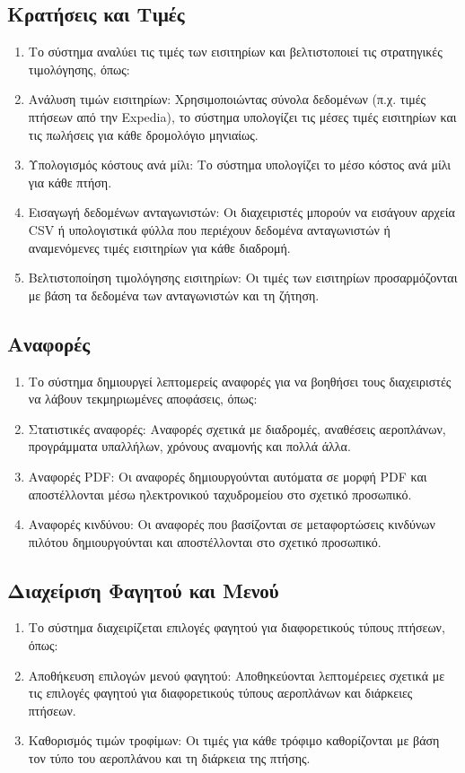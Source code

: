 \documentclass{article}
\begin{document}
	\subsection{Κρατήσεις και Τιμές}
	\begin{enumerate}
		\item Το σύστημα αναλύει τις τιμές των εισιτηρίων και βελτιστοποιεί τις στρατηγικές τιμολόγησης, όπως:
		\item Ανάλυση τιμών εισιτηρίων: Χρησιμοποιώντας σύνολα δεδομένων (π.χ. τιμές πτήσεων από την Expedia), το σύστημα υπολογίζει τις μέσες τιμές εισιτηρίων και τις πωλήσεις για κάθε δρομολόγιο μηνιαίως.
		\item Υπολογισμός κόστους ανά μίλι: Το σύστημα υπολογίζει το μέσο κόστος ανά μίλι για κάθε πτήση.
		\item Εισαγωγή δεδομένων ανταγωνιστών: Οι διαχειριστές μπορούν να εισάγουν αρχεία CSV ή υπολογιστικά φύλλα που περιέχουν δεδομένα ανταγωνιστών ή αναμενόμενες τιμές εισιτηρίων για κάθε διαδρομή.
		\item Βελτιστοποίηση τιμολόγησης εισιτηρίων: Οι τιμές των εισιτηρίων προσαρμόζονται με βάση τα δεδομένα των ανταγωνιστών και τη ζήτηση.
	\end{enumerate}
	
	\subsection{Αναφορές}
	\begin{enumerate}
		\item Το σύστημα δημιουργεί λεπτομερείς αναφορές για να βοηθήσει τους διαχειριστές να λάβουν τεκμηριωμένες αποφάσεις, όπως:
		\item Στατιστικές αναφορές: Αναφορές σχετικά με διαδρομές, αναθέσεις αεροπλάνων, προγράμματα υπαλλήλων, χρόνους αναμονής και πολλά άλλα.
		\item Αναφορές PDF: Οι αναφορές δημιουργούνται αυτόματα σε μορφή PDF και αποστέλλονται μέσω ηλεκτρονικού ταχυδρομείου στο σχετικό προσωπικό.
		\item Αναφορές κινδύνου: Οι αναφορές που βασίζονται σε μεταφορτώσεις κινδύνων πιλότου δημιουργούνται και αποστέλλονται στο σχετικό προσωπικό.
	\end{enumerate}
	
	\subsection{Διαχείριση Φαγητού και Μενού}
	\begin{enumerate}
		\item Το σύστημα διαχειρίζεται επιλογές φαγητού για διαφορετικούς τύπους πτήσεων, όπως:
		\item Αποθήκευση επιλογών μενού φαγητού: Αποθηκεύονται λεπτομέρειες σχετικά με τις επιλογές φαγητού για διαφορετικούς τύπους αεροπλάνων και διάρκειες πτήσεων.
		\item Καθορισμός τιμών τροφίμων: Οι τιμές για κάθε τρόφιμο καθορίζονται με βάση τον τύπο του αεροπλάνου και τη διάρκεια της πτήσης.
	\end{enumerate}
	
\end{document}
